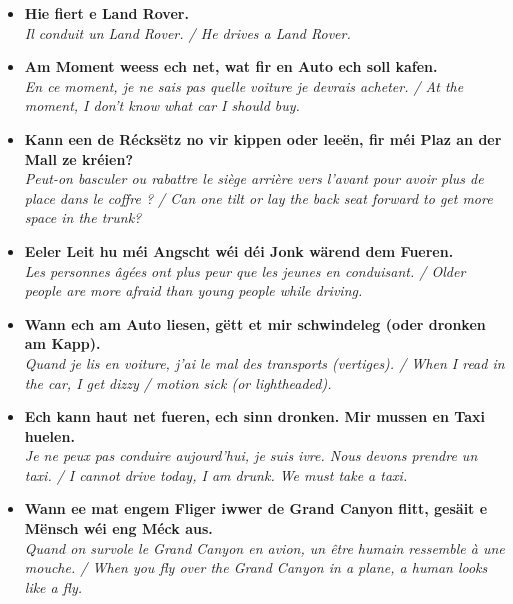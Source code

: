 \begin{itemize}
    \item \textbf{Hie fiert e Land Rover.} \\
    \textit{Il conduit un Land Rover. / He drives a Land Rover.}
    
    \item \textbf{Am Moment weess ech net, wat fir en Auto ech soll kafen.} \\
    \textit{En ce moment, je ne sais pas quelle voiture je devrais acheter. / At the moment, I don't know what car I should buy.}
    
    \item \textbf{Kann een de Récksëtz no vir kippen oder leeën, fir méi Plaz an der Mall ze kréien?} \\
    \textit{Peut-on basculer ou rabattre le siège arrière vers l'avant pour avoir plus de place dans le coffre ? / Can one tilt or lay the back seat forward to get more space in the trunk?}
    
    \item \textbf{Eeler Leit hu méi Angscht wéi déi Jonk wärend dem Fueren.} \\
    \textit{Les personnes âgées ont plus peur que les jeunes en conduisant. / Older people are more afraid than young people while driving.}
    
    \item \textbf{Wann ech am Auto liesen, gëtt et mir schwindeleg (oder dronken am Kapp).} \\
    \textit{Quand je lis en voiture, j'ai le mal des transports (vertiges). / When I read in the car, I get dizzy / motion sick (or lightheaded).}
    
    \item \textbf{Ech kann haut net fueren, ech sinn dronken. Mir mussen en Taxi huelen.} \\
    \textit{Je ne peux pas conduire aujourd'hui, je suis ivre. Nous devons prendre un taxi. / I cannot drive today, I am drunk. We must take a taxi.}
    
    \item \textbf{Wann ee mat engem Fliger iwwer de Grand Canyon flitt, gesäit e Mënsch wéi eng Méck aus.} \\
    \textit{Quand on survole le Grand Canyon en avion, un être humain ressemble à une mouche. / When you fly over the Grand Canyon in a plane, a human looks like a fly.}
\end{itemize}

\vspace{1cm}


